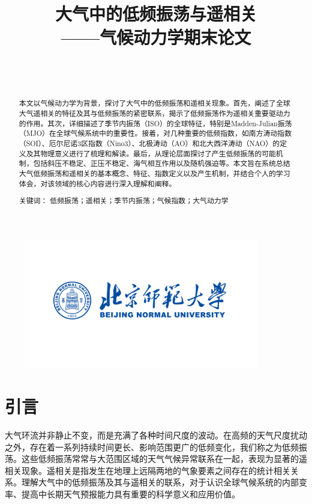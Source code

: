 \documentclass[10pt,hyperref,a4paper,UTF8]{ctexart}
\title{\vspace{-12pt}
        \songti \Huge \textbf{{大气中的低频振荡与遥相关}} \\
        \vspace{12pt}
        \songti \huge \textbf{{——气候动力学期末论文}}
        \vspace{12pt}
        }%
\author{
        \vspace{12pt}
        \kaishu\LARGE
        \makebox[5em][s]{学号}\ \ful[7cm]{202111030007} \\  %
        \vspace{12pt}
        \kaishu\LARGE
        \makebox[5em][s]{姓名}\ \ful[7cm]{郑晓旸} \\  %
        }
\date{}
\begin{document}
\begin{figure}
	\centering
	\includegraphics[width=0.9\textwidth]{figures/bnu.pdf}
\end{figure} 

\maketitle
\thispagestyle{empty}
\newpage
\setcounter{page}{1}
\begin{abstract}
        本文以气候动力学\cite{WeatherDynamics}为背景，探讨了大气中的低频振荡和遥相关现象。首先，阐述了全球大气遥相关的特征及其与低频振荡的紧密联系，揭示了低频振荡作为遥相关重要驱动力的作用。其次，详细描述了季节内振荡（ISO）的全球特征，特别是Madden-Julian振荡（MJO）在全球气候系统中的重要性。接着，对几种重要的低频指数，如南方涛动指数（SOI）、厄尔尼诺3区指数（Nino3）、北极涛动（AO）和北大西洋涛动（NAO）的定义及其物理意义进行了梳理和解读。最后，从理论层面探讨了产生低频振荡的可能机制，包括斜压不稳定、正压不稳定、海气相互作用以及随机强迫等。本文旨在系统总结大气低频振荡和遥相关的基本概念、特征、指数定义以及产生机制，并结合个人的学习体会，对该领域的核心内容进行深入理解和阐释。

        \heiti 关键词： \songti 低频振荡；遥相关；季节内振荡；气候指数；大气动力学
\end{abstract}
\section{引言}
大气环流并非静止不变，而是充满了各种时间尺度的波动。在高频的天气尺度扰动之外，存在着一系列持续时间更长、影响范围更广的低频变化，我们称之为低频振荡。这些低频振荡常常与大范围区域的天气气候异常联系在一起，表现为显著的遥相关现象。遥相关是指发生在地理上远隔两地的气象要素之间存在的统计相关关系。理解大气中的低频振荡及其与遥相关的联系，对于认识全球气候系统的内部变率、提高中长期天气预报能力具有重要的科学意义和应用价值。
\end{document}
